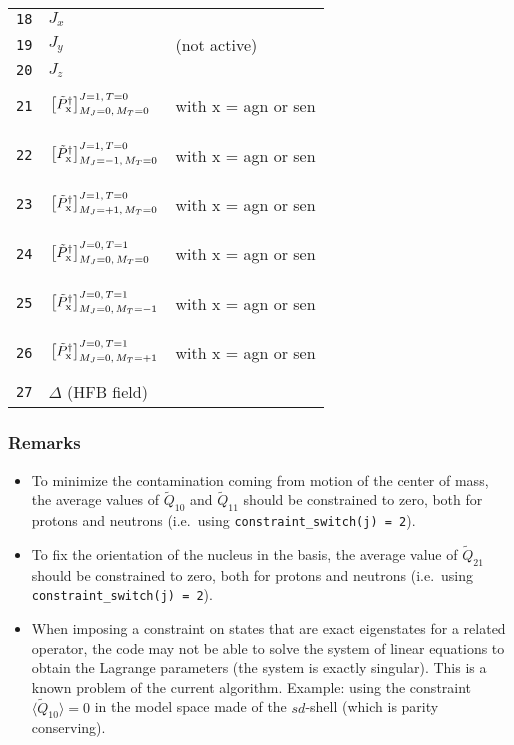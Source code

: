 \documentclass[a4paper,11pt]{article}
\newcommand{\ttt}[1]{\texttt{#1}}
\begin{document}
\begin{center}
\begin{tabular}{|r|ll|}
 \ttt{18} & $J_x$ & \\
 \ttt{19} & $J_y$ & (not active) \\
 \ttt{20} & $J_z$ & \\
 \ttt{21} & $\vphantom{\Bigg(} \left[ \tilde{P}^\dagger_{\text{x}} \right]^{J=1,\, T=0}_{M_J =0,\,  M_T =0}$ &with x = agn or sen \\
 \ttt{22} & $\vphantom{\Bigg(} \left[ \tilde{P}^\dagger_{\text{x}} \right]^{J=1,\, T=0}_{M_J =-1,\, M_T =0}$ &with x = agn or sen \\
 \ttt{23} & $\vphantom{\Bigg(} \left[ \tilde{P}^\dagger_{\text{x}} \right]^{J=1,\, T=0}_{M_J =+1,\, M_T =0}$ &with x = agn or sen \\
 \ttt{24} & $\vphantom{\Bigg(} \left[ \tilde{P}^\dagger_{\text{x}} \right]^{J=0,\, T=1}_{M_J =0,\, M_T =0}$  &with x = agn or sen \\
 \ttt{25} & $\vphantom{\Bigg(} \left[ \tilde{P}^\dagger_{\text{x}} \right]^{J=0,\, T=1}_{M_J =0,\, M_T =-1}$ &with x = agn or sen \\
 \ttt{26} & $\vphantom{\Bigg(} \left[ \tilde{P}^\dagger_{\text{x}} \right]^{J=0,\, T=1}_{M_J =0,\, M_T =+1}$ &with x = agn or sen \\
 \ttt{27} & $\Delta$ (HFB field) & \\
\hline
\end{tabular}
\end{center}

\subsubsection*{Remarks}

\begin{itemize}
  \item To minimize the contamination coming from motion of the center of mass, the average values of $\tilde{Q}_{10}$ and $\tilde{Q}_{11}$
  should be constrained to zero, both for protons and neutrons (i.e.\ using \ttt{constraint\_switch(j) = 2}).
  \item To fix the orientation of the nucleus in the basis, the average value of $\tilde{Q}_{21}$ should be constrained to zero, both for protons and neutrons 
  (i.e.\ using \ttt{constraint\_switch(j) = 2}).
  \item When imposing a constraint on states that are exact eigenstates for a related operator, the code may not be able to 
  solve the system of linear equations to obtain the Lagrange parameters (the system is exactly singular). This is a known problem of the current algorithm.
  Example: using the constraint $\langle \tilde{Q}_{10} \rangle = 0$ in the model space made of the $sd$-shell (which is parity conserving).
\end{itemize}
\end{document}
